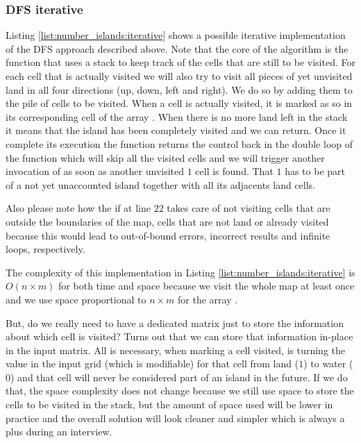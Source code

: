 \subsubsection{DFS iterative}
\label{sec:num_island:iterative}
Listing \ref{list:number_islands:iterative} shows a possible iterative implementation of the DFS
approach described above. Note that the core of the algorithm is the function  that
uses a stack to keep track of the cells that are still to be visited. For each cell that is actually
visited we will also try to visit all pieces of yet unvisited land in all four directions (up, down,
left and right). We do so by adding them to the pile of cells to be visited. When a cell is actually
visited, it is marked as so in its corresponding cell of the array .
When there is no  more land left in the stack it means that the island has been completely visited 
and we can return. Once it complete its execution the function 
returns the control back in the double loop of the function  which will skip all the
visited cells and we will trigger another invocation of  as soon as another unvisited $1$ cell is
found. That $1$ has to be part of a not yet unaccounted island together with all its adjacents land cells.

Also please note how the if at line $22$ takes care of not visiting cells that are outside the
boundaries of the map, cells that are not land or already visited because this would lead to
out-of-bound errors, incorrect results and infinite loops, respectively.

The complexity of this implementation in Listing \ref{list:number_islands:iterative} is 
$O(n\times m)$ for both time and space 
because we visit the whole map at least once and we use space proportional to $n\times m$
for the array .



But, do we really need to have a dedicated matrix just to store the information about which cell is visited?
Turns out that we can store that information in-place in the input matrix. All is necessary, when marking a cell visited, is turning
the value in the input grid (which is modifiable) for that cell from land ($1$) to water ($0$) and that cell will never be considered part
of an island in the future. If we do that, the space complexity does not change because we still use
space to store the cells to be visited in the stack,
but the amount of space used will be lower in practice and the overall solution will look cleaner and simpler which is always a plus during an
interview. 

